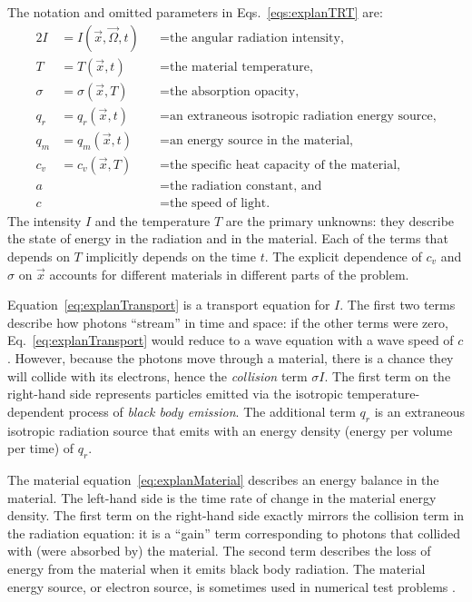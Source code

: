 The notation and omitted parameters in Eqs.~\eqref{eqs:explanTRT} are:
\begin{alignat*}{2}
  I &= I(\vec{x}, \vec{\Omega}, t) &&= \text{the angular
  radiation intensity,}
  \\
  T &= T(\vec{x}, t) &&= \text{the material temperature,}
  \\
  \sigma &= \sigma(\vec{x}, T) &&= \text{the absorption opacity,} 
  \\
  q_r &= q_r(\vec{x}, t) &&= \text{an extraneous isotropic radiation energy source,}
  \\
  q_m &= q_m(\vec{x}, t) &&= \text{an energy source in the material,}
  \\
  c_v &= c_v(\vec{x}, T) &&= \text{the specific heat capacity of the material,}
  \\
  a& &&= \text{the radiation constant, and}
  \\
  c& &&= \text{the speed of light.}
\end{alignat*}
The intensity $I$ and the temperature $T$ are the primary unknowns: they
describe the state of energy in the radiation and in the material.
Each of the terms that depends on $T$ implicitly depends on the time $t$. The
explicit dependence of $c_v$ and $\sigma$ on $\vec{x}$ accounts for different
materials in different parts of the problem.

Equation~\eqref{eq:explanTransport} is a transport equation for $I$. The first
two terms describe how photons ``stream'' in time and space: if the
other terms were zero, Eq.~\eqref{eq:explanTransport} would reduce to a
wave equation with a wave speed of $c$. However, because the photons move 
through a material, there is a chance they will collide with its electrons,
hence the \emph{collision} term $\sigma I$. The first term on the right-hand
side represents particles emitted via the isotropic temperature-dependent
process of \emph{black body emission}. The additional term $q_r$ is an extraneous
isotropic radiation source that emits with an energy density (energy per
volume per time) of $q_r$.

The material equation~\eqref{eq:explanMaterial} describes an energy balance in
the material. The left-hand side is the time rate of change in the material
energy density. The first term on the right-hand side exactly mirrors the collision term in the
radiation equation: it is a ``gain'' term corresponding to photons that
collided with (were absorbed by) the material. The second term describes the loss
of energy from the material when it emits black body radiation. The material
energy source, or electron source, is sometimes used in numerical test problems
\cite{Ada2010}.

